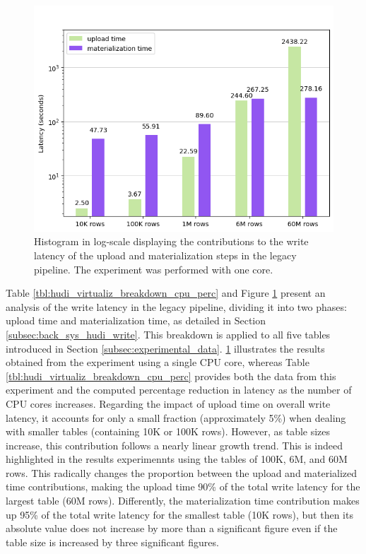 \begin{figure}
\begin{minipage}[b]{\textwidth}
        \includegraphics[width=\textwidth]{figures/5-results/hudi_iceberg_delta/hudi_virtualiz1_core.png}
        \caption[Histogram of the write on legacy pipeline - Time breakdown - 1 core]{Histogram in log-scale displaying the contributions to the write latency of the upload and materialization steps in the legacy pipeline. The experiment was performed with one  core.}
        \label{fig:hudi_virtualiz_breakdown}
    \end{minipage}
\end{figure}

Table \ref{tbl:hudi_virtualiz_breakdown_cpu_perc} and Figure \ref{fig:hudi_virtualiz_breakdown} present an analysis of the write latency in the legacy pipeline, dividing it into two phases: upload time and materialization time, as detailed in Section \ref{subsec:back_sys_hudi_write}. This breakdown is applied to all five tables introduced in Section \ref{subsec:experimental_data}. \ref{fig:hudi_virtualiz_breakdown} illustrates the results obtained from the experiment using a single \gls{CPU} core, whereas Table \ref{tbl:hudi_virtualiz_breakdown_cpu_perc} provides both the data from this experiment and the computed percentage reduction in latency as the number of \gls{CPU} cores increases. 
Regarding the impact of upload time on overall write latency, it accounts for only a small fraction (approximately 5\%) when dealing with smaller tables (containing 10K or 100K rows). However, as table sizes increase, this contribution follows a nearly linear growth trend. This is indeed highlighted in the results experimennts using the tables of 100K, 6M, and 60M rows. This radically changes the proportion between the upload and materialized time contributions, making the upload time 90\% of the total write latency for the largest table (60M rows). Differently, the materialization time contribution makes up 95\% of the total write latency for the smallest table (10K rows), but then its absolute value does not increase by more than a significant figure even if the table size is increased by three significant figures.


